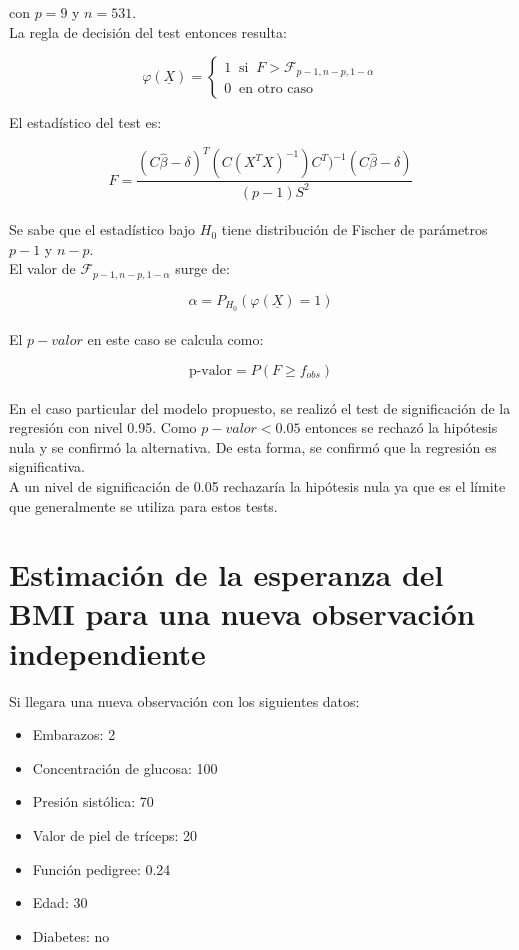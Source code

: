 \documentclass{article}
\begin{document}
\noindent
con \(p=9\) y \(n=531\).\\

\noindent
La regla de decisión del test entonces resulta:

$$\varphi(\underline{X}) = \begin{cases}
                            1 \; \; \text{si} \; \;  F > \mathcal{F}_{p-1,n-p,1-\alpha}\\
                            0 \; \; \text{en otro caso}
                        \end{cases}$$

\noindent
El estadístico del test es:

$$F = \frac{(C\hat{\beta}-\delta)^T(C(X^TX)^{-1})C^T)^{-1}(C\hat{\beta}-\delta)}{(p-1)S^2}$$\\

\noindent
Se sabe que el estadístico bajo \(H_0\) tiene distribución de Fischer de parámetros \(p-1\) y \(n - p\).\\

\noindent
El valor de \(\mathcal{F}_{p-1,n-p,1-\alpha}\) surge de:

$$\alpha = P_{H_0}(\varphi(\underline{X})=1)$$\\

\noindent
El \(p-valor\) en este caso se calcula como:

$$\text{p-valor} = P(F \geq f_{obs})$$\\

\noindent
En el caso particular del modelo propuesto, se realizó el test de significación de la regresión con nivel 0.95. Como \(p-valor < 0.05\) entonces se rechazó la hipótesis nula y se confirmó la alternativa. De esta forma, se confirmó que la regresión es significativa.\\

\noindent
A un nivel de significación de 0.05 rechazaría la hipótesis nula ya que es el límite que generalmente se utiliza para estos tests.





\section{Estimación de la esperanza del BMI para una nueva observación independiente}

Si llegara una nueva observación con los siguientes datos:
\begin{itemize}
  \item Embarazos: 2
  \item Concentración de glucosa: 100
  \item Presión sistólica: 70
  \item Valor de piel de tríceps: 20
  \item Función pedigree: 0.24
  \item Edad: 30
  \item Diabetes: no
\end{itemize}
\end{document}
